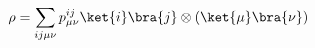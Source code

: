 \begin{equation}\label{eqn:rho_bi}
\rho = \sum_{ij\mu\nu}p^{ij}_{\mu\nu}\ket{i}\bra{j} \otimes (\ket{\mu}\bra{\nu})
\end{equation}

